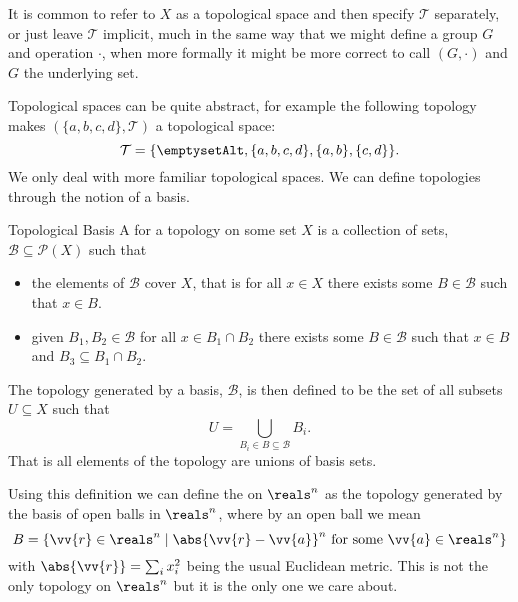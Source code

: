 \documentclass[fleqn]{NotesClass}
\begin{document}
    It is common to refer to \(X\) as a topological space and then specify \(\mathcal{T}\) separately, or just leave \(\mathcal{T}\) implicit, much in the same way that we might define a group \(G\) and operation \(\cdot\), when more formally it might be more correct to call \((G, \cdot)\) and \(G\) the underlying set.
    
    Topological spaces can be quite abstract, for example the following topology makes \((\{a, b, c, d\}, \mathcal{T})\) a topological space:
    \begin{equation}
        \mathcal{T} = \{\emptysetAlt, \{a, b, c, d\}, \{a, b\}, \{c, d\}\}.
    \end{equation}
    We only deal with more familiar topological spaces.
    We can define topologies through the notion of a basis.
    
    \begin{dfn}{Topological Basis}{}
        A  for a topology on some set \(X\) is a collection of sets, \(\mathcal{B} \subseteq \mathcal{P}(X)\) such that
        \begin{itemize}
            \item the elements of \(\mathcal{B}\) cover \(X\), that is for all \(x \in X\) there exists some \(B \in \mathcal{B}\) such that \(x \in B\).
            \item given \(B_1, B_2 \in \mathcal{B}\) for all \(x \in B_1 \cap B_2\) there exists some \(B \in \mathcal{B}\) such that \(x \in B\) and \(B_3 \subseteq B_1 \cap B_2\).
        \end{itemize}
        The topology generated by a basis, \(\mathcal{B}\), is then defined to be the set of all subsets \(U \subseteq X\) such that\vspace{-0.5ex}
        \begin{equation}
            U = \bigcup_{B_i \in B \subseteq \mathcal{B}} B_i.
        \end{equation}\vspace{-0.5ex}
        That is all elements of the topology are unions of basis sets.
    \end{dfn}
    
    Using this definition we can define the  on \(\reals^n\) as the topology generated by the basis of open balls in \(\reals^n\), where by an open ball we mean
    \begin{equation}
        B = \{\vv{r} \in \reals^n \mid \abs{\vv{r} - \vv{a}}^{n} \text{ for some } \vv{a} \in \reals^n\}
    \end{equation}
    with \(\abs{\vv{r}} = \sum_i x_i^2\) being the usual Euclidean metric.
    This is not the only topology on \(\reals^n\) but it is the only one we care about.
    
\end{document}
